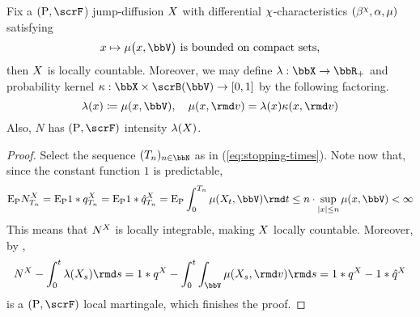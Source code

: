 \begin{lemma}
  \label{lemma:countable}
  Fix a $(\Prb, \scrF$) jump-diffusion $X$ with differential $\chi$-characteristics $(\beta^\chi, \alpha, \mu)$ satisfying
  \begin{equation*}
    \stateVar \mapsto \affJump\big(\stateVar, \vecSpace\big) \text{ is bounded on compact sets,}
  \end{equation*}
  then $X$ is locally countable.
  Moreover, we may define $\affInt: \stateSpace \rightarrow \bbR_+$ and probability kernel $\affDist: \stateSpace \times \scrB(\vecSpace) \rightarrow [0,1]$ by the following factoring.
  \begin{equation*}
    \affInt(\stateVar) \defeq \affJump(\stateVar, \vecSpace), \quad \affJump(\stateVar, \rmd\markVar) = \affInt(\stateVar) \affDist(\stateVar, \rmd\markVar)
  \end{equation*}
  Also, $N$ has $(\Prb, \scrF)$ intensity $\lambda(X)$.
\end{lemma}
\begin{proof}
  \label{proof:lemma:countable}
  Select the sequence $(T_n)_{n\in\bbN}$ as in (\ref{eq:stopping-times}).
  Note now that, since the constant function $1$ is predictable,
  \begin{equation*}
    \Exp_\Prb \N^\X_{T_n}
    = \Exp_\Prb 1 \ast \jumpMeas^\X_{T_n}
    = \Exp_\Prb 1 \ast \predproj{\jumpMeas^\X}_{T_n}
    = \Exp_\Prb \int_0^{T_n} \affJump(\X_t, \vecSpace) \rmd t
    \leq n \cdot \sup_{|\stateVar| \leq n} \affJump(\stateVar, \vecSpace) < \infty
  \end{equation*}
  This means that $N^X$ is locally integrable, making $X$ locally countable.
  Moreover, by \cite[Theorem II.1.8]{jacod2003},
  \begin{equation*}
    \N^\X - \int_0^t \affInt(\X_s) \rmd s
    = 1 \ast \jumpMeas^\X - \int_0^t \int_\vecSpace \affJump(\X_s, \rmd\markVar) \rmd s
    = 1 \ast \jumpMeas^\X - 1 \ast \predproj{\jumpMeas^\X}
  \end{equation*}
  is a $(\Prb, \scrF)$ local martingale, which finishes the proof.
\end{proof}
